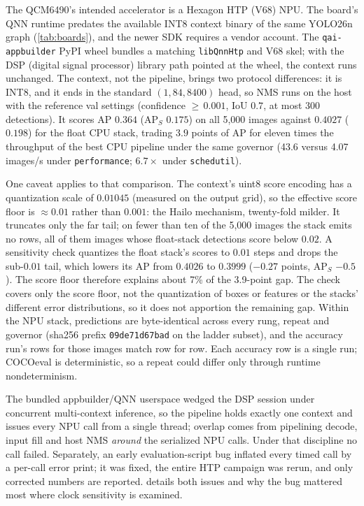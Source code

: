 The QCM6490's intended accelerator is a Hexagon HTP (V68) NPU. The
board's QNN runtime predates the available INT8 context binary of the
same YOLO26n graph (\cref{tab:boards}), and the newer SDK requires a
vendor account. The \texttt{qai-appbuilder} PyPI wheel bundles a
matching \texttt{libQnnHtp} and V68 skel; with the DSP (digital signal
processor) library path pointed at the wheel, the context runs
unchanged. The context, not the pipeline, brings two
protocol differences: it is INT8, and it ends in the standard
$(1{,}84{,}8400)$ head, so NMS runs on the host with the reference val
settings (confidence ${\ge}\,0.001$, IoU $0.7$, at most 300
detections). It scores AP $0.364$ (AP$_S$ $0.175$) on all 5,000 images
against $0.4027$ ($0.198$) for the float CPU stack, trading $3.9$
points of AP for eleven times the throughput of the best CPU pipeline
under the same governor (43.6 versus 4.07\,images/s under
\texttt{performance}; $6.7\times$ under \texttt{schedutil}).

One caveat applies to that comparison. The context's uint8 score
encoding has a quantization scale of $0.01045$ (measured on the output
grid), so the effective score floor is ${\approx}0.01$ rather than
$0.001$: the Hailo mechanism, twenty-fold milder. It truncates only
the far tail; on fewer than ten of the 5,000 images the stack emits no
rows, all of them images whose float-stack detections score below
$0.02$. A sensitivity check quantizes the float stack's scores to
$0.01$ steps and drops the sub-$0.01$ tail, which lowers its AP from
$0.4026$ to $0.3999$ ($-0.27$ points, AP$_S$ $-0.5$). The score floor
therefore explains about 7\% of the 3.9-point gap. The check covers
only the score floor, not the quantization of boxes or features or the
stacks' different error distributions, so it does not apportion the
remaining gap. Within the NPU stack, predictions are byte-identical
across every rung, repeat and governor (sha256 prefix
\texttt{09de71d67bad} on the ladder subset), and the accuracy run's
rows for those images match row for row. Each accuracy row is a single
run; COCOeval is deterministic, so a repeat could differ only through
runtime nondeterminism.

The bundled appbuilder/QNN userspace wedged the DSP session under
concurrent multi-context inference, so the pipeline holds exactly one
context and issues every NPU call from a single thread; overlap comes
from pipelining decode, input fill and host NMS \emph{around} the
serialized NPU calls. Under that discipline no call failed. Separately,
an early evaluation-script bug inflated every timed call by a per-call
error print; it was fixed, the entire HTP campaign was rerun, and only
corrected numbers are reported.  details both issues and
why the bug mattered most where clock sensitivity is examined.

